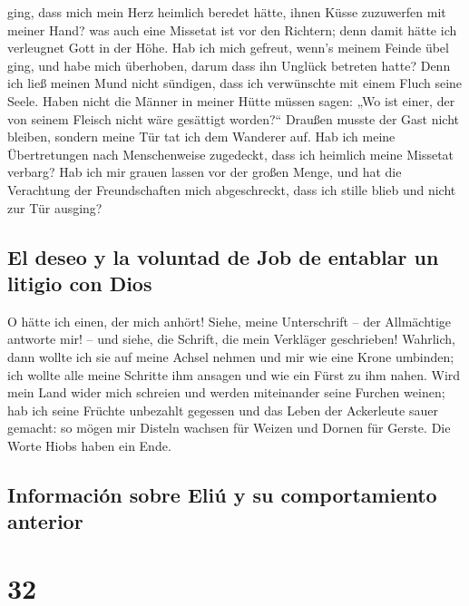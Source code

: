 ging,  dass mich mein Herz heimlich beredet hätte, ihnen
Küsse zuzuwerfen mit meiner Hand?  was auch eine Missetat
ist vor den Richtern; denn damit hätte ich verleugnet Gott in der Höhe.
 Hab ich mich gefreut, wenn's meinem Feinde übel ging,
und habe mich überhoben, darum dass ihn Unglück betreten hatte?
 Denn ich ließ meinen Mund nicht sündigen, dass ich
verwünschte mit einem Fluch seine Seele.  Haben nicht die
Männer in meiner Hütte müssen sagen: „Wo ist einer, der von seinem
Fleisch nicht wäre gesättigt worden?{}``  Draußen musste
der Gast nicht bleiben, sondern meine Tür tat ich dem Wanderer auf.
 Hab ich meine Übertretungen nach Menschenweise
zugedeckt, dass ich heimlich meine Missetat verbarg?  Hab
ich mir grauen lassen vor der großen Menge, und hat die Verachtung der
Freundschaften mich abgeschreckt, dass ich stille blieb und nicht zur
Tür ausging?

\hypertarget{el-deseo-y-la-voluntad-de-job-de-entablar-un-litigio-con-dios}{%
\subsection{El deseo y la voluntad de Job de entablar un litigio con
Dios}\label{el-deseo-y-la-voluntad-de-job-de-entablar-un-litigio-con-dios}}

 O hätte ich einen, der mich anhört! Siehe, meine
Unterschrift -- der Allmächtige antworte mir! -- und siehe, die Schrift,
die mein Verkläger geschrieben!  Wahrlich, dann wollte
ich sie auf meine Achsel nehmen und mir wie eine Krone umbinden;
 ich wollte alle meine Schritte ihm ansagen und wie ein
Fürst zu ihm nahen.  Wird mein Land wider mich schreien
und werden miteinander seine Furchen weinen;  hab ich
seine Früchte unbezahlt gegessen und das Leben der Ackerleute sauer
gemacht:  so mögen mir Disteln wachsen für Weizen und
Dornen für Gerste. Die Worte Hiobs haben ein Ende.

\hypertarget{informaciuxf3n-sobre-eliuxfa-y-su-comportamiento-anterior}{%
\subsection{Información sobre Eliú y su comportamiento
anterior}\label{informaciuxf3n-sobre-eliuxfa-y-su-comportamiento-anterior}}

\hypertarget{section-31}{%
\section{32}\label{section-31}}

